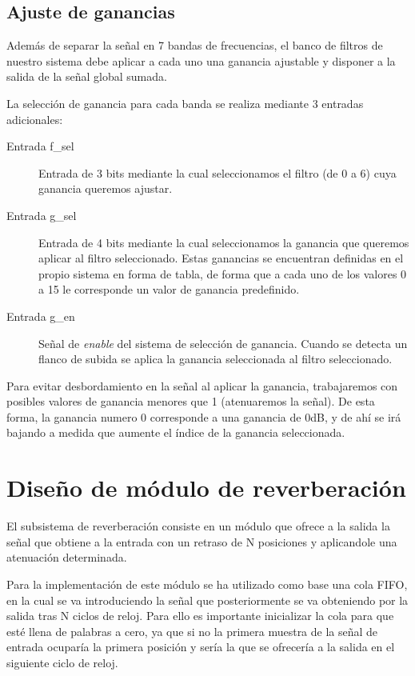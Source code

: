 \documentclass[a4paper,12pt]{article}
\begin{document}
\subsection{Ajuste de ganancias}
Además de separar la señal en 7 bandas de frecuencias, el banco de filtros de nuestro sistema debe aplicar a cada uno una ganancia ajustable y disponer a la salida de la señal global sumada.

La selección de ganancia para cada banda se realiza mediante 3 entradas adicionales:
\begin{description}
\item[Entrada f\_sel] Entrada de 3 bits mediante la cual seleccionamos el filtro (de 0 a 6) cuya ganancia queremos ajustar.
\item[Entrada g\_sel] Entrada de 4 bits mediante la cual seleccionamos la ganancia que queremos aplicar al filtro seleccionado. Estas ganancias se encuentran definidas en el propio sistema en forma de tabla, de forma que a cada uno de los valores 0 a 15 le corresponde un valor de ganancia predefinido.
\item[Entrada g\_en] Señal de \emph{enable} del sistema de selección de ganancia. Cuando se detecta un flanco de subida se aplica la ganancia seleccionada al filtro seleccionado.
\end{description}

Para evitar desbordamiento en la señal al aplicar la ganancia, trabajaremos con posibles valores de ganancia menores que 1 (atenuaremos la señal). De esta forma, la ganancia numero 0 corresponde a una ganancia de 0dB, y de ahí se irá bajando a medida que aumente el índice de la ganancia seleccionada.

\section{Diseño de módulo de reverberación}
El subsistema de reverberación consiste en un módulo que ofrece a la salida la señal que obtiene a la entrada con un retraso de N posiciones y aplicandole una atenuación determinada.

Para la implementación de este módulo se ha utilizado como base una cola FIFO, en la cual se va introduciendo la señal que posteriormente se va obteniendo por la salida tras N ciclos de reloj. Para ello es importante inicializar la cola para que esté llena de palabras a cero, ya que si no la primera muestra de la señal de entrada ocuparía la primera posición y sería la que se ofrecería a la salida en el siguiente ciclo de reloj.
\end{document}
